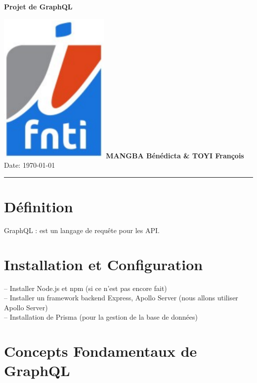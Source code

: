 \documentclass[a4paper,12pt]{article}
\begin{document}
\begin{titlepage}
    \centering
    {\Huge \textbf{Projet de GraphQL}}\\ 
  
    \vspace{1.5cm}
   
     \vspace{0.5cm}
    \vspace{2cm}
    \includegraphics[width=0.4\textwidth]{image.png} %
    \vfill
    {\large \textbf{MANGBA Bénédicta \& TOYI François}} \vspace{0.5cm}
    {\large Date: \today}
    \vspace{0.5cm}
    \color{blue!50} %
    \rule{10cm}{1pt} %
    \vspace{0.5cm}
\end{titlepage}

\newpage

\section{Définition}
GraphQL : est un langage de requête pour les API.

\section{Installation et Configuration}
– Installer Node.js et npm (si ce n'est pas encore fait)\\
– Installer un framework backend Express, Apollo Server (nous allons utiliser Apollo Server)\\
– Installation de Prisma (pour la gestion de la base de données)

\section{Concepts Fondamentaux de GraphQL}
\end{document}
